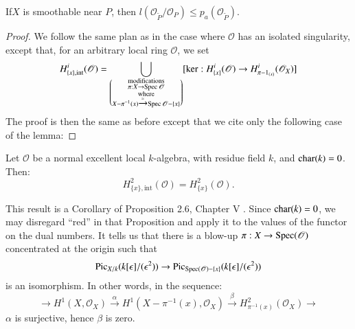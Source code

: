\begin{theorem*}
If\pageoriginale $X$ is smoothable near $P$, then
$l(\mathscr{O}_{\widetilde{P}}/\mathscr{O}_{P})\leq
p_{a}(\mathscr{O}_{\widetilde{P}})$. 
\end{theorem*}

\begin{proof}
We follow the same plan as in the case where $\mathscr{O}$ has an
isolated singularity, except that, for an arbitrary local ring
$\mathscr{O}$, we set
$$
H^{i}_{\{x\},\text{int}}(\mathscr{O})=\bigcup_{\left(\substack{\text{modifications}\\
\pi:X\to \operatorname{Spec}\mathscr{O}\\ \text{where}\\
X-\pi^{-1}(x)\xrightarrow{\approx}\operatorname{Spec} \mathscr{O}-\{x\}}\right)}[\ker:
H^{i}_{\{x\}}(\mathscr{O})\to H^{i}_{\pi-1_{(x)}}(\mathscr{O}_{X})]
$$
The proof is then the same as before except that we cite only the
following case of the lemma:
\end{proof}

\begin{theorem*}
Let $\mathscr{O}$ be a normal excellent local $k$-algebra, with
residue field $k$, and $\operatorname{char} (k)=0$. Then:
$$
H^{2}_{\{x\},\text{int}}(\mathscr{O})=H^{2}_{\{x\}}(\mathscr{O}). 
$$
\end{theorem*}

This result is a Corollary of Proposition 2.6, Chapter
V \cite{art01-key17}. Since $\operatorname{char}(k)=0$, we may disregard ``red'' in
that Proposition and apply it to the values of the functor on the dual
numbers. It tells us that there is a blow-up
$\pi:X\to \operatorname{Spec}(\mathscr{O})$ concentrated at the origin such that
$$
\operatorname{Pic}_{X/k}(k[\epsilon]/(\epsilon^{2}))\to \operatorname{Pic}_{\operatorname{Spec}(\mathscr{O})-\{x\}}(k[\epsilon]/(\epsilon^{2})) 
$$
is an isomorphism. In other words, in the sequence:
$$
\to H^{1}(X,\mathscr{O}_{X})\xrightarrow{\alpha}
H^{1}(X-\pi^{-1}(x),\mathscr{O}_{X})\xrightarrow{\beta}H^{2}_{\pi^{-1}(x)}(\mathscr{O}_{X})\to 
$$
$\alpha$ is surjective, hence $\beta$ is zero.

